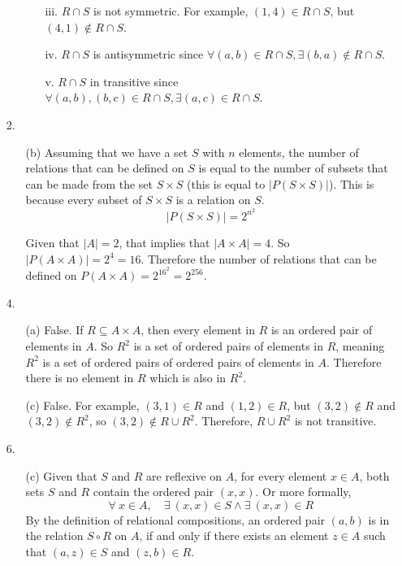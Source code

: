 \documentclass[fleqn]{article}
\begin{document}
\begin{enumerate}
\begin{enumerate}
\begin{enumerate}
			\item[iii.]
			\(R \cap S\) is not symmetric. For example, \((1, 4) \in R \cap S\), but \((4, 1) \notin R \cap S\).

			\item[iv.]
			\(R \cap S\) is antisymmetric since \(\forall (a, b) \in R \cap S, \exists (b, a) \notin R \cap S\).

			\item[v.]
			\(R \cap S\) in transitive since \(\forall (a, b), (b, c) \in R \cap S, \exists (a, c) \in R \cap S\).
		\end{enumerate}
	\end{enumerate}

	\item[2.]
	\begin{enumerate}
		\item[(b)]
		Assuming that we have a set \(S\) with \(n\) elements, the number of relations that can be defined on \(S\) is equal to the number of subsets that can be made from the set \(S \times S\) (this is equal to \(| P(S \times S) |\)). This is because every subset of \(S \times S\) is a relation on \(S\).
		\[| P(S \times S) | = 2^{n^{2}}\]

		Given that \(| A | = 2\), that implies that \(| A \times A | = 4\). So \(| P(A \times A) | = 2^4 = 16\). Therefore the number of relations that can be defined on \(P(A \times A) = 2^{16^{2}} = 2^{256}\).
	\end{enumerate}

	\item[4.]
	\begin{enumerate}
		\item[(a)]
		False. If \(R \subseteq A \times A\), then every element in \(R\) is an ordered pair of elements in \(A\). So \(R^{2}\) is a set of ordered pairs of elements in \(R\), meaning \(R^{2}\) is a set of ordered pairs of ordered pairs of elements in \(A\). Therefore there is no element in \(R\) which is also in \(R^{2}\).

		\item[(c)]
		False. For example, \((3, 1) \in R\) and \((1, 2) \in R\), but \((3, 2) \notin R\) and \((3, 2) \notin R^{2}\), so \((3, 2) \notin R \cup R^{2}\). Therefore, \(R \cup R^{2}\) is not transitive.
	\end{enumerate}

	\item[6.]
	\begin{enumerate}
		\item[(c)]
		Given that \(S\) and \(R\) are reflexive on \(A\), for every element \(x \in A\), both sets \(S\) and \(R\) contain the ordered pair \((x, x)\). Or more formally,
		\[\forall \ x \in A, \quad \exists \ (x, x) \in S \land \exists \ (x, x) \in R\]
		By the definition of relational compositions, an ordered pair \((a, b)\) is in the relation \(S \circ R\) on \(A\), if and only if there exists an element \(z \in A\) such that \((a, z) \in S\) and \((z, b) \in R\).


\end{enumerate}
\end{enumerate}
\end{document}
